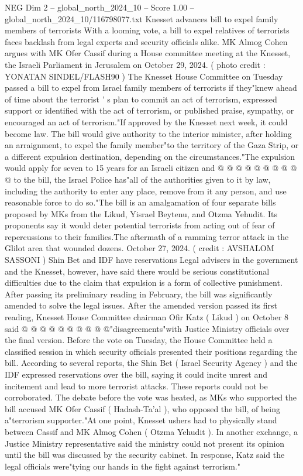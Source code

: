 \begin{textsample}{NEG Dim 2 – global\_north\_2024\_10 – Score 1.00 – global\_north\_2024\_10/116798077.txt}  \label{ex:f2_neg_371}
Knesset advances bill to expel family members of terrorists With a looming vote, a bill to expel relatives of terrorists faces backlash from legal experts and security officials alike.
MK Almog Cohen argues with MK Ofer Cassif during a House committee meeting at the Knesset, the Israeli Parliament in Jerusalem on October 29, 2024. ( photo credit : YONATAN SINDEL/FLASH90 ) The Knesset House Committee on Tuesday passed a bill to expel from Israel family members of terrorists if they"knew ahead of time about the terrorist ' s plan to commit an act of terrorism, expressed support or identified with the act of terrorism, or published praise, sympathy, or encouraged an act of terrorism."If approved by the Knesset next week, it could become law.
The bill would give authority to the interior minister, after holding an arraignment, to expel the family member"to the territory of the Gaza Strip, or a different expulsion destination, depending on the circumstances."The expulsion would apply for seven to 15 years for an Israeli citizen and @ @ @ @ @ @ @ @ @ @ to the bill, the Israel Police has"all of the authorities given to it by law, including the authority to enter any place, remove from it any person, and use reasonable force to do so."The bill is an amalgamation of four separate bills proposed by MKs from the Likud, Yisrael Beytenu, and Otzma Yehudit.
Its proponents say it would deter potential terrorists from acting out of fear of repercussions to their families.The aftermath of a ramming terror attack in the Glilot area that wounded dozens.
October 27, 2024. ( credit : AVSHALOM SASSONI ) Shin Bet and IDF have reservations Legal advisers in the government and the Knesset, however, have said there would be serious constitutional difficulties due to the claim that expulsion is a form of collective punishment.
After passing its preliminary reading in February, the bill was significantly amended to solve the legal issues.
After the amended version passed its first reading, Knesset House Committee chairman Ofir Katz ( Likud ) on October 8 said @ @ @ @ @ @ @ @ @ @"disagreements"with Justice Ministry officials over the final version.
Before the vote on Tuesday, the House Committee held a classified session in which security officials presented their positions regarding the bill.
According to several reports, the Shin Bet ( Israel Security Agency ) and the IDF expressed reservations over the bill, saying it could incite unrest and incitement and lead to more terrorist attacks.
These reports could not be corroborated.
The debate before the vote was heated, as MKs who supported the bill accused MK Ofer Cassif ( Hadash-Ta'al ), who opposed the bill, of being a"terrorism supporter."At one point, Knesset ushers had to physically stand between Cassif and MK Almog Cohen ( Otzma Yehudit ).
In another exchange, a Justice Ministry representative said the ministry could not present its opinion until the bill was discussed by the security cabinet.
In response, Katz said the legal officials were"tying our hands in the fight against terrorism."

\end{textsample}

